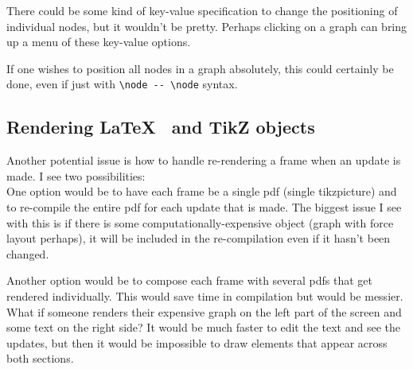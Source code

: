 \documentclass{article}
\begin{document}
There could be some kind of key-value specification to change the positioning
of individual nodes, but it wouldn't be pretty. Perhaps clicking on a graph can
bring up a menu of these key-value options.

If one wishes to position all nodes in a graph absolutely, this could certainly be
done, even if just with \verb|\node -- \node| syntax.

\subsection*{Rendering \LaTeX~ and TikZ objects}
Another potential issue is how to handle re-rendering a frame when an update is made.
I see two possibilities: \\

One option would be to have each frame be a single pdf (single tikzpicture) and to re-compile the
entire pdf for each update that is made. The biggest issue I see with this is if
there is some computationally-expensive object (graph with force layout perhaps),
it will be included in the re-compilation even if it hasn't been changed.

Another option would be to compose each frame with several pdfs that get rendered
individually. This would save time in compilation but would be messier. What if someone
renders their expensive graph on the left part of the screen and some text on the
right side? It would be much faster to edit the text and see the updates, but then
it would be impossible to draw elements that appear across both sections. 
\end{document}
